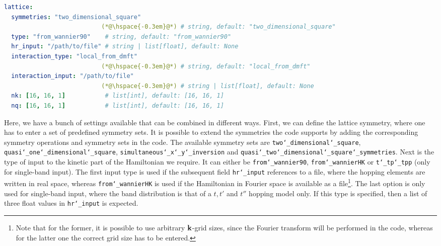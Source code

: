 \documentclass[../../main.tex]{subfiles}
\begin{document}
\begin{minipage}{\textwidth}%
\begin{lstlisting}[language=yaml]
lattice:
  symmetries: "two_dimensional_square"
                           (*@\hspace{-0.3em}@*) # string, default: "two_dimensional_square"
  type: "from_wannier90"    # string, default: "from_wannier90"
  hr_input: "/path/to/file" # string | list[float], default: None
  interaction_type: "local_from_dmft"
                           (*@\hspace{-0.3em}@*) # string, default: "local_from_dmft"
  interaction_input: "/path/to/file"
                           (*@\hspace{-0.3em}@*) # string | list[float], default: None
  nk: [16, 16, 1]           # list[int], default: [16, 16, 1]
  nq: [16, 16, 1]           # list[int], default: [16, 16, 1]
\end{lstlisting}
\end{minipage}
Here, we have a bunch of settings available that can be combined in different ways. First, we can define the lattice symmetry, where one has to enter a set of predefined symmetry sets. It is possible to extend the symmetries the code supports by adding the corresponding symmetry operations and symmetry sets in the code. The available symmetry sets are \texttt{two\char`_dimensional\char`_square}, \texttt{quasi\char`_one\char`_dimensional\char`_square}, \texttt{simultaneous\char`_x\char`_y\char`_inversion} and \texttt{quasi\char`_two\char`_dimensional\char`_square\char`_symmetries}. Next is the type of input to the kinetic part of the Hamiltonian we require. It can either be \texttt{from\char`_wannier90}, \texttt{from\char`_wannierHK} or \texttt{t\char`_tp\char`_tpp} (only for single-band input). The first input type is used if the subsequent field \texttt{hr\char`_input} references to a file, where the hopping elements are written in real space, whereas \texttt{from\char`_wannierHK} is used if the Hamiltonian in Fourier space is available as a file\footnote{Note that for the former, it is possible to use arbitrary $\textbf{k}$-grid sizes, since the Fourier transform will be performed in the code, whereas for the latter one the correct grid size has to be entered.}. The last option is only used for single-band input, where the band distribution is that of a $t, t'$ and $t''$ hopping model only. If this type is specified, then a list of three float values in \texttt{hr\char`_input} is expected.
\end{document}
